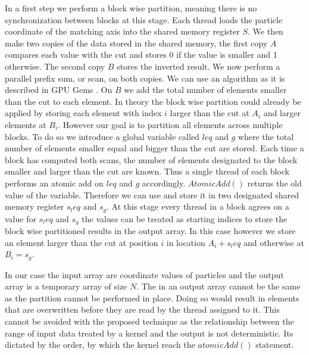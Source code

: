 \documentclass[]{article}
\begin{document}
In a first step we perform a block wise partition, meaning there is no synchronization between blocks at this stage. Each thread loads the particle coordinate of the matching axis into the shared memory register $S$. We then make two copies of the data stored in the shared memory, the first copy $A$ compares each value with the cut and stores 0 if the value is smaller and 1 otherwise. The second copy $B$ stores the inverted result. 
We now perform a parallel prefix sum, or scan, on both copies. We can use an algorithm as it is described in GPU Gems \cite{SCAN}. On $B$ we add the total number of elements smaller than the cut to each element. 
In theory the block wise partition could already be applied by storing each element with index $i$ larger than the cut at $A_i$ and larger elements at $B_i$. 
However our goal is to partition all elements across multiple blocks. To do so we introduce a global variable called $leq$ and $g$ where the total number of elements smaller equal and bigger than the cut are stored. Each time a block has computed both scans, the number of elements designated to the block smaller and larger than the cut are known. Thus a single thread of each block performs an atomic add on $leq$ and $g$ accordingly. $AtomicAdd()$ returns the old value of the variable. Therefore we can use and store it in two designated shared memory register $s_leq$ and $s_g$. 
At this stage every thread in a block agrees on a value for $s_leq$ and $s_g$ the values can be treated as starting indices to store the block wise partitioned results in the output array. In this case however we store an element larger than the cut at position $i$ in location $A_i + s_leq$ and otherwise at $B_i = s_g$. 

In our case the input array are coordinate values of particles and the output array is a temporary array of size $N$. The in an output array cannot be the same as the partition cannot be performed in place. Doing so would result in elements that are overwritten before they are read by the thread assigned to it. This cannot be avoided with the proposed technique as the relationship between the range of input data treated by a kernel and the output is not deterministic. Its dictated by the order, by which the kernel reach the $atomicAdd()$ statement. 
\end{document}

